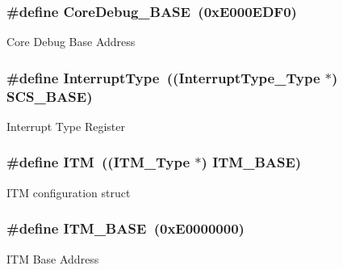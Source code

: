 \subsubsection[{\texorpdfstring{Core\+Debug\+\_\+\+B\+A\+SE}{CoreDebug_BASE}}]{\setlength{\rightskip}{0pt plus 5cm}\#define Core\+Debug\+\_\+\+B\+A\+SE~(0x\+E000\+E\+D\+F0)}\hypertarget{group__CMSIS__CM3__core__register_ga680604dbcda9e9b31a1639fcffe5230b}{}\label{group__CMSIS__CM3__core__register_ga680604dbcda9e9b31a1639fcffe5230b}
Core Debug Base Address 
\subsubsection[{\texorpdfstring{Interrupt\+Type}{InterruptType}}]{\setlength{\rightskip}{0pt plus 5cm}\#define Interrupt\+Type~(({\bf Interrupt\+Type\+\_\+\+Type} $\ast$) {\bf S\+C\+S\+\_\+\+B\+A\+SE})}\hypertarget{group__CMSIS__CM3__core__register_ga164238adbad56f07c7dd4e912af748dd}{}\label{group__CMSIS__CM3__core__register_ga164238adbad56f07c7dd4e912af748dd}
Interrupt Type Register 
\subsubsection[{\texorpdfstring{I\+TM}{ITM}}]{\setlength{\rightskip}{0pt plus 5cm}\#define I\+TM~(({\bf I\+T\+M\+\_\+\+Type} $\ast$)           {\bf I\+T\+M\+\_\+\+B\+A\+SE})}\hypertarget{group__CMSIS__CM3__core__register_gabae7cdf882def602cb787bb039ff6a43}{}\label{group__CMSIS__CM3__core__register_gabae7cdf882def602cb787bb039ff6a43}
I\+TM configuration struct 
\subsubsection[{\texorpdfstring{I\+T\+M\+\_\+\+B\+A\+SE}{ITM_BASE}}]{\setlength{\rightskip}{0pt plus 5cm}\#define I\+T\+M\+\_\+\+B\+A\+SE~(0x\+E0000000)}\hypertarget{group__CMSIS__CM3__core__register_gadd76251e412a195ec0a8f47227a8359e}{}\label{group__CMSIS__CM3__core__register_gadd76251e412a195ec0a8f47227a8359e}
I\+TM Base Address 
